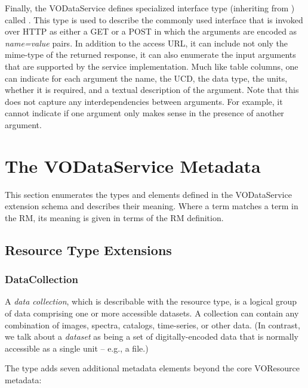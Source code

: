 \documentclass[11pt,a4paper]{ivoa}
\begin{document}
Finally, the VODataService defines specialized interface type
(inheriting from ) called
.  This type is used to describe the commonly
used interface that is invoked over HTTP as either a GET or a POST 
in which the arguments are encoded as
\emph{name=value} pairs.  In addition to the access URL, it can
include not only the mime-type of the returned response, it can also
enumerate the input arguments that are supported by the service
implementation.  Much like table columns, one can indicate for each
argument the name, the UCD, the data type, the units, whether it is
required, and a textual description of the argument.  Note that this does
not capture any interdependencies between arguments.  For example, it
cannot indicate if one argument only makes sense in the presence of
another argument.  


\section{The VODataService Metadata}
\label{sect:metadata}


This section enumerates the types and elements defined in the
VODataService extension schema and describes their meaning.  Where a
term matches a term in the RM, its meaning is given
in terms of the RM definition.  


\subsection{Resource Type Extensions}
\label{sect:resext}

\subsubsection{DataCollection}
\label{sect:datacollection}


A \emph{data collection}, which is describable with the
 resource type, is a logical
group of data comprising one or more accessible
datasets.  A collection can contain any combination of images,
spectra, catalogs, time-series, or other data.  (In contrast, we talk
about a \emph{dataset} as being a set of digitally-encoded
data that is normally accessible as a single unit -- e.g., a file.)



The  type adds seven additional metadata
elements beyond the core VOResource metadata:
\end{document}
